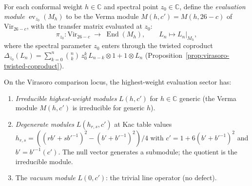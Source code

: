\begin{construction}
\label{constr:virasoro-eval-modules}
For each conformal weight $h \in \mathbb{C}$ and
spectral point $z_0 \in \mathbb{C}$, define the
\emph{evaluation module}
$\operatorname{ev}_{z_0}(M_h)$ to be the Verma module
$M(h, c') = M(h, 26{-}c)$ of $\mathrm{Vir}_{26-c}$,
with the transfer matrix evaluated at $z_0$:
\begin{equation}\label{eq:virasoro-eval}
\pi_{z_0} \colon \mathrm{Vir}_{26-c}
\;\to\;
\operatorname{End}(M_h),
\qquad
L_n \mapsto L_n\big|_{M_h},
\end{equation}
where the spectral parameter $z_0$ enters through the
twisted coproduct
$\Delta_{z_0}(L_n) = \sum_{k=0}^n \binom{n}{k}\,z_0^k\,
L_{n-k} \otimes 1 + 1 \otimes L_n$
(Proposition~\ref{prop:virasoro-twisted-coproduct}).

On the Virasoro comparison locus, the highest-weight evaluation
sector has:
\begin{enumerate}[label=\textup{(\roman*)}]
\item \emph{Irreducible highest-weight modules}
 $L(h,c')$ for $h \in \mathbb{C}$ generic
 (the Verma module $M(h,c')$ is irreducible
 for generic $h$).
\item \emph{Degenerate modules} $L(h_{r,s},c')$ at
 Kac table values $h_{r,s} = ((rb'+sb'^{-1})^2 -
 (b'+b'^{-1})^2)/4$ with
 $c' = 1 + 6(b'+b'^{-1})^2$ and
 $b' = b'^{-1}(c')$.
 The null vector generates a submodule; the quotient
 is the irreducible module.
\item The \emph{vacuum module} $L(0, c')$: the trivial
 line operator (no defect).
\end{enumerate}
\end{construction}

